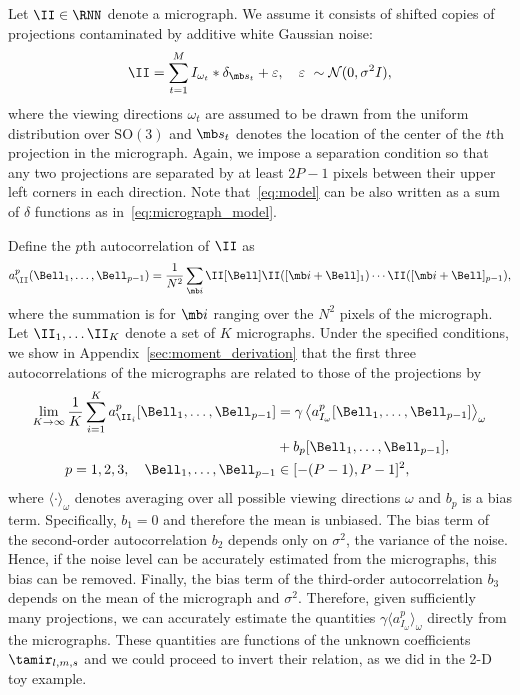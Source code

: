 \documentclass[9pt,twocolumn,twoside,lineno]{pnas-new}
\begin{document}
Let $\II\in\RNN$ denote a micrograph. We assume it consists of shifted copies of projections contaminated by additive white Gaussian noise:
\begin{equation}\label{eq:micrograph_model}
\II = \sum_{t=1}^{M} I_{\omega_t}\ast\delta_{\mb s_t}+ \varepsilon, \quad \varepsilon~\sim\mathcal{N}(0,\sigma^2 I),
\end{equation}
where the viewing directions $\omega_t$ are assumed to be drawn from the uniform distribution over $\text{SO}(3)$ and $\mb s_t$ denotes the location of the center of the $t$th projection in the micrograph. %
Again, we impose a separation condition so that any two projections are separated by at least $2P-1$ pixels between their upper left corners  in each direction.
Note that~\eqref{eq:model} can be also written as a sum of $\delta$ functions as in~\eqref{eq:micrograph_model}. 

Define the $p$th autocorrelation of $\II$ as
\begin{equation*} \label{eq:Kth_autocorrelation}
a^p_\II(\Bell_1,\ldots, \Bell_{p-1}) = \frac{1}{N^2}\sum_{\mb i}\II[\Bell]\II([\mb i+\Bell]_1)\cdots \II([\mb i+\Bell]_{p-1}),
\end{equation*}
where the summation is for $\mb i $ ranging over the $N^2$  pixels of the micrograph. %
Let $\II_1,\ldots\II_K$ denote a set of $K$ micrographs. 
Under the specified conditions, we show in Appendix~\ref{sec:moment_derivation} that the first three autocorrelations  of the micrographs are related to those of the projections by 
\begin{align} \label{eq:ac_micrographs}
\lim_{K\to\infty}\frac{1}{K}\sum_{i=1}^Ka^p_{\II_i}[\Bell_1,\ldots,\Bell_{p-1}]  &= \gamma\left\langle a^p_{I_\omega}[\Bell_1,\ldots,\Bell_{p-1}]\right\rangle_{\omega} \\&+ b_p[\Bell_1,\ldots,\Bell_{p-1}], \\ p=1,2,3, \quad \Bell_1,\ldots,\Bell_{p-1}&\in[-(P-1),P-1]^2, \nonumber
\end{align}
where $\langle\cdot\rangle_\omega$ denotes averaging over all possible viewing directions $\omega$ and $b_p$ is a bias term. 
Specifically,  $b_1 = 0$ and therefore the mean is unbiased. The bias term of the second-order autocorrelation  $b_2$ depends only on $\sigma^2$, the variance of the noise. Hence, if the noise level can be accurately estimated from the micrographs, this bias can be removed. 
Finally, the bias term of the third-order autocorrelation $b_3$ depends on the mean of the micrograph and $\sigma^2$.  Therefore, given sufficiently many projections, we can accurately estimate the quantities $\gamma\langle a^p_{I_{\omega}}\rangle_{\omega}$ directly from the micrographs. These quantities are functions of the unknown coefficients $\tamir_{l,m,s}$ and we could proceed to invert their relation, as we did in the 2-D toy example. 
\end{document}
